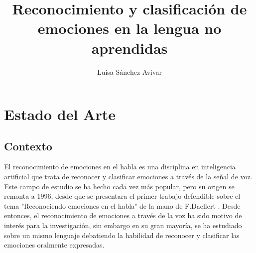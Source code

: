 \documentclass[11pt,a4paper,spanish]{book}
\begin{document}
	\title{Reconocimiento y clasificación de emociones en la lengua no aprendidas}
	\author{Luisa Sánchez Avivar}
	
	\chapter{Estado del Arte}
	\section{Contexto}
	El reconocimiento de emociones en el habla es una disciplina en inteligencia artificial que trata de reconocer y clasificar emociones a través de la señal de voz. Este campo de estudio se ha hecho cada vez más popular, pero su origen se remonta a 1996, desde que se presentara el primer trabajo defendible sobre el tema "Reconociendo emociones en el habla" de la mano de F.Daellert \cite{Dellaert1996}.
	Desde entonces, el reconocimiento de emociones a través de la voz ha sido motivo de interés para la investigación, sin embargo en su gran mayoría, se ha estudiado sobre un mismo lenguaje debatiendo la habilidad de reconocer y clasificar las emociones oralmente expresadas. 
	
	
\end{document}
